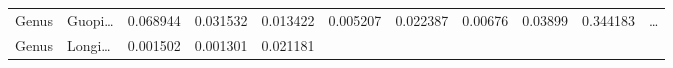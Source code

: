 \documentclass[
]{article}
\begin{document}
\begin{longtable}[]{@{}lllllllllll@{}}
\begin{minipage}[t]{0.06\columnwidth}
Genus\strut
\end{minipage} & \begin{minipage}[t]{0.06\columnwidth}\raggedright
Guopi\ldots{}\strut
\end{minipage} & \begin{minipage}[t]{0.09\columnwidth}\raggedright
0.068944\strut
\end{minipage} & \begin{minipage}[t]{0.06\columnwidth}\raggedright
0.031532\strut
\end{minipage} & \begin{minipage}[t]{0.09\columnwidth}\raggedright
0.013422\strut
\end{minipage} & \begin{minipage}[t]{0.06\columnwidth}\raggedright
0.005207\strut
\end{minipage} & \begin{minipage}[t]{0.09\columnwidth}\raggedright
0.022387\strut
\end{minipage} & \begin{minipage}[t]{0.06\columnwidth}\raggedright
0.00676\strut
\end{minipage} & \begin{minipage}[t]{0.06\columnwidth}\raggedright
0.03899\strut
\end{minipage} & \begin{minipage}[t]{0.06\columnwidth}\raggedright
0.344183\strut
\end{minipage} & \begin{minipage}[t]{0.03\columnwidth}\raggedright
\ldots{}\strut
\end{minipage}\tabularnewline
\begin{minipage}[t]{0.06\columnwidth}\raggedright
Genus\strut
\end{minipage} & \begin{minipage}[t]{0.06\columnwidth}\raggedright
Longi\ldots{}\strut
\end{minipage} & \begin{minipage}[t]{0.09\columnwidth}\raggedright
0.001502\strut
\end{minipage} & \begin{minipage}[t]{0.06\columnwidth}\raggedright
0.001301\strut
\end{minipage} & \begin{minipage}[t]{0.09\columnwidth}\raggedright
0.021181\strut
\end{minipage} & \begin{minipage}[t]{0.06\columnwidth}\raggedright

\end{minipage}
\end{longtable}
\end{document}
